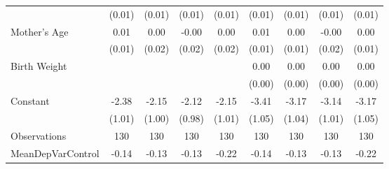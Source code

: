 {\begin{tabular}{l*{8}{c}}
                    &      (0.01)         &      (0.01)         &      (0.01)         &      (0.01)         &      (0.01)         &      (0.01)         &      (0.01)         &      (0.01)         \\
[1em]
Mother's Age        &        0.01         &        0.00         &       -0.00         &        0.00         &        0.01         &        0.00         &       -0.00         &        0.00         \\
                    &      (0.01)         &      (0.02)         &      (0.02)         &      (0.02)         &      (0.01)         &      (0.01)         &      (0.02)         &      (0.01)         \\
[1em]
Birth Weight        &                     &                     &                     &                     &        0.00\sym{***}&        0.00\sym{***}&        0.00\sym{***}&        0.00\sym{**} \\
                    &                     &                     &                     &                     &      (0.00)         &      (0.00)         &      (0.00)         &      (0.00)         \\
[1em]
Constant            &       -2.38\sym{**} &       -2.15\sym{**} &       -2.12\sym{**} &       -2.15\sym{**} &       -3.41\sym{***}&       -3.17\sym{***}&       -3.14\sym{***}&       -3.17\sym{***}\\
                    &      (1.01)         &      (1.00)         &      (0.98)         &      (1.01)         &      (1.05)         &      (1.04)         &      (1.01)         &      (1.05)         \\
\hline
Observations        &         130         &         130         &         130         &         130         &         130         &         130         &         130         &         130         \\
MeanDepVarControl   &       -0.14         &       -0.13         &       -0.13         &       -0.22         &       -0.14         &       -0.13         &       -0.13         &       -0.22         \\
\hline\hline
\end{tabular}
}
